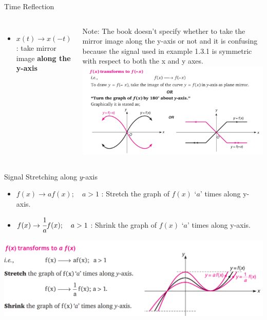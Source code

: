 \documentclass[aspectratio=169,xcolor=dvipsnames,svgnames,x11names,fleqn]{beamer}
\begin{document}
\begin{frame}{Time Reflection}
\begin{columns}
    \begin{itemize}
    \item $x(t) \to x(-t)$ : take  mirror image\textbf{ along the y-axis}
    \end{itemize}
      Note: The book doesn’t specify whether to take the mirror image along the y-axis or not and it is confusing because the signal used in example 1.3.1 is symmetric with respect to both the x and y axes.
       \includegraphics[width=0.9\linewidth,trim=0 0 0 0cm,clip]{figures/Time_Reflection.png}
\end{columns}
\end{frame}


\begin{frame}{Signal Stretching along $y$-axis}

    \begin{itemize}
    \item $f(x) \to a f(x); \quad a > 1$ : Stretch the graph of $f(x)$ `$a$' times along y-axis.
    \item $f(x) \to \cfrac{1}{a} f(x); \quad a > 1$ : Shrink the graph of $f(x)$ `$a$' times along y-axis.
    
    \end{itemize}

       \includegraphics[width=0.9\linewidth,trim=0 0 0 0cm,clip]{figures/Signal_Stretch.png}

\end{frame}
\end{document}
